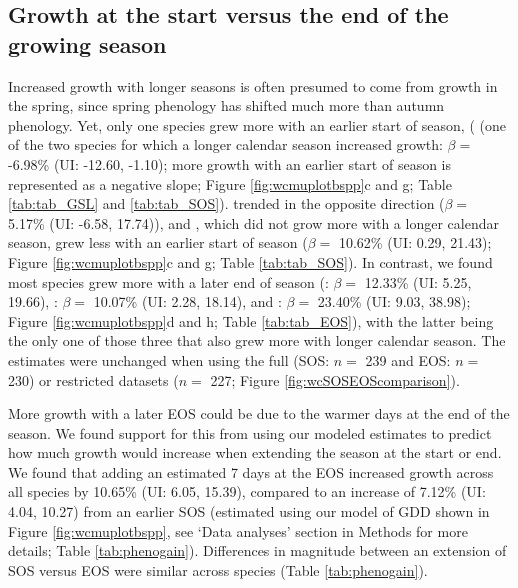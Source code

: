 \documentclass{article}\usepackage[]{graphicx}\usepackage[]{xcolor}
\begin{document}
\subsection*{Growth at the start versus the end of the growing season}
Increased growth with longer seasons is often presumed to come from growth in the spring, since spring phenology has shifted much more than autumn phenology. Yet, only one species grew more with an earlier start of season, ({\Ainc} (one of the two species for which a longer calendar season increased growth: $\beta =$
-6.98\% (UI: -12.60, -1.10); more growth with an earlier start of season is represented as a negative slope; Figure \ref{fig:wcmuplotbspp}c and g; Table \ref{tab:tab_GSL} and \ref{tab:tab_SOS}). {\Bpop} trended in the opposite direction ($\beta =$
5.17\% (UI: -6.58, 17.74)), and {\Ball}, which did not grow more with a longer calendar season, grew less with an earlier start of season ($\beta =$
10.62\% (UI: 0.29, 21.43); Figure \ref{fig:wcmuplotbspp}c and g; Table \ref{tab:tab_SOS}). In contrast, we found most species grew more with a later end of season ({\Ball}: $\beta =$ 
12.33\% (UI: 5.25, 19.66), {\Bpop}: $\beta =$
10.07\% (UI: 2.28, 18.14), and {\Bpap}: $\beta =$
23.40\% (UI: 9.03, 38.98); Figure \ref{fig:wcmuplotbspp}d and h; Table \ref{tab:tab_EOS}), with the latter being the only one of those three that also grew more with longer calendar season. The estimates were unchanged when using the full (SOS: $n =$
239 and EOS: $n =$
230) or restricted datasets ($n =$ 
227; Figure \ref{fig:wcSOSEOScomparison}).

More growth with a later EOS could be due to the warmer days at the end of the season. We found support for this from using our modeled estimates to predict how much growth would increase when extending the season at the start or end. We found that adding an estimated 7 days at the EOS increased growth across all species by 
10.65\% (UI: 6.05, 15.39), compared to an increase of
7.12\% (UI: 4.04, 10.27) from an earlier SOS (estimated using our model of GDD shown in Figure \ref{fig:wcmuplotbspp}, see `Data analyses' section in Methods for more details; Table \ref{tab:phenogain}). Differences in magnitude between an extension of SOS versus EOS were similar across species (Table \ref{tab:phenogain}).
\end{document}
